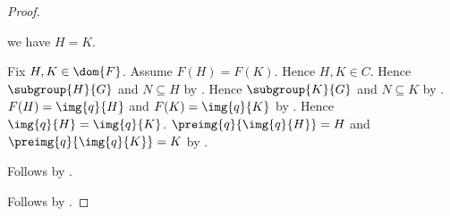 \begin{proof}
\begin{subproof}
            we have $H=K$.
        \begin{subproof}
            Fix $H,K\in\dom{F}$.
            Assume $F(H)=F(K)$.
            Hence $H,K\in C$.
            Hence $\subgroup{H}{G}$ and $N\subseteq H$ by \auto.
            Hence $\subgroup{K}{G}$ and $N\subseteq K$ by \auto.
            $F(H)=\img{q}{H}$ and $F(K)=\img{q}{K}$ by
                .
            Hence $\img{q}{H}=\img{q}{K}$.
            $\preimg{q}{\img{q}{H}}=H$ and
                $\preimg{q}{\img{q}{K}}=K$ by
                .
        \end{subproof}
        Follows by .
    \end{subproof}
    Follows by .
\end{proof}

